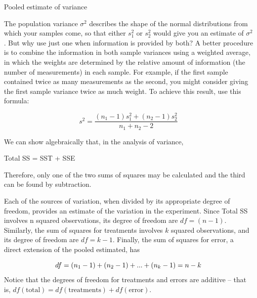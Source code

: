 \documentclass[
  ignorenonframetext,
  aspectratio=169]{beamer}
\begin{document}
\begin{frame}{Pooled estimate of variance}
\protect\hypertarget{pooled-estimate-of-variance}{}
\small

The population variance \(\sigma^2\) describes the shape of the normal
distributions from which your samples come, so that either \(s_1^2\) or
\(s_2^2\) would give you an estimate of \(\sigma^2\) . But why use just
one when information is provided by both? A better procedure is to
combine the information in both sample variances using a weighted
average, in which the weights are determined by the relative amount of
information (the number of measurements) in each sample. For example, if
the first sample contained twice as many measurements as the second, you
might consider giving the first sample variance twice as much weight. To
achieve this result, use this formula:

\[
s^2 = \frac{(n_1 - 1)s_1^2 + (n_2 - 1)s_2^2}{n_1 + n_2 - 2}
\]

We can show algebraically that, in the analysis of variance,

Total SS = SST + SSE

Therefore, only one of the two sums of squares may be calculated and the
third can be found by subtraction.
\end{frame}

\begin{frame}{}
\protect\hypertarget{section-4}{}
\small

Each of the sources of variation, when divided by its appropriate degree
of freedom, provides an estimate of the variation in the experiment.
Since Total SS involves n squared observations, its degree of freedom
are \(df = (n - 1)\). Similarly, the sum of squares for treatments
involves \(k\) squared observations, and its degree of freedom are
\(df = k - 1\). Finally, the sum of squares for error, a direct
extension of the pooled estimated, has

\[
\small
df = (n_1 - 1) + (n_2 - 1) + ... + (n_k - 1) = n - k
\] Notice that the degrees of freedom for treatments and errors are
additive -- that is,
\(df(\text{total}) = df(\text{treatments}) + df (\text{error})\).
\end{frame}
\end{document}
